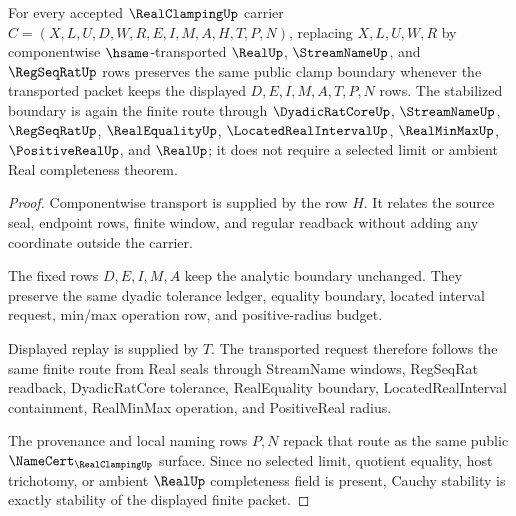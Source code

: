 \begin{theorem}
\label{thm:real-clamping-cauchy-stability}
For every accepted $\RealClampingUp$ carrier $C=(X,L,U,D,W,R,E,I,M,A,H,T,P,N)$, replacing $X,L,U,W,R$ by componentwise $\hsame$-transported $\RealUp$, $\StreamNameUp$, and $\RegSeqRatUp$ rows preserves the same public clamp boundary whenever the transported packet keeps the displayed $D,E,I,M,A,T,P,N$ rows. The stabilized boundary is again the finite route through $\DyadicRatCoreUp$, $\StreamNameUp$, $\RegSeqRatUp$, $\RealEqualityUp$, $\LocatedRealIntervalUp$, $\RealMinMaxUp$, $\PositiveRealUp$, and $\RealUp$; it does not require a selected limit or ambient Real completeness theorem.
\end{theorem}
\begin{proof}
Componentwise transport is supplied by the row $H$. It relates the source seal, endpoint rows, finite window, and regular readback without adding any coordinate outside the carrier.

The fixed rows $D,E,I,M,A$ keep the analytic boundary unchanged. They preserve the same dyadic tolerance ledger, equality boundary, located interval request, min/max operation row, and positive-radius budget.

Displayed replay is supplied by $T$. The transported request therefore follows the same finite route from Real seals through StreamName windows, RegSeqRat readback, DyadicRatCore tolerance, RealEquality boundary, LocatedRealInterval containment, RealMinMax operation, and PositiveReal radius.

The provenance and local naming rows $P,N$ repack that route as the same public $\NameCert_{\RealClampingUp}$ surface. Since no selected limit, quotient equality, host trichotomy, or ambient $\RealUp$ completeness field is present, Cauchy stability is exactly stability of the displayed finite packet.
\end{proof}



